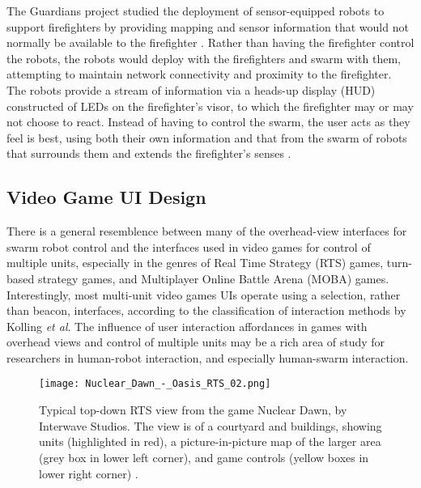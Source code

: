 The Guardians project studied the deployment of sensor-equipped robots to support firefighters by providing mapping and sensor information that would not normally be available to the firefighter \citep{gancet2010user}.
Rather than having the firefighter control the robots, the robots would deploy with the firefighters and swarm with them, attempting to maintain network connectivity and proximity to the firefighter. 
The robots provide a stream of information via a heads-up display (HUD) constructed of LEDs on the firefighter's visor, to which the firefighter may or may not choose to react. 
Instead of having to control the swarm, the user acts as they feel is best, using both their own information and that from the swarm of robots that surrounds them and extends the firefighter's senses \citep{penders2011robot}. 


\subsection{Video Game UI Design} \label{section:Video_Game_UI_Design}

There is a general resemblence between many of the overhead-view interfaces for swarm robot control and the interfaces used in video games for control of multiple units, especially in the genres of Real Time Strategy (RTS) games, turn-based strategy games, and Multiplayer Online Battle Arena (MOBA) games. 
Interestingly, most multi-unit video games UIs operate using a selection, rather than beacon, interfaces, according to the classification of interaction methods by Kolling \emph{et al}. 
The influence of user interaction affordances in games with overhead views and control of multiple units may be a rich area of study for researchers in human-robot interaction, and especially human-swarm interaction. 

\begin{figure}
	\centering
	\texttt{[image: Nuclear\_Dawn\_-\_Oasis\_RTS\_02.png]}
	\caption{Typical top-down RTS view from the game Nuclear Dawn, by Interwave Studios. The view is of a courtyard and buildings, showing units (highlighted in red), a picture-in-picture map of the larger area (grey box in lower left corner), and game controls (yellow boxes in lower right corner) \protect\citep{nucleardawn}.}
	\label{fig:Nuclear_dawn_rts}
\end{figure}

